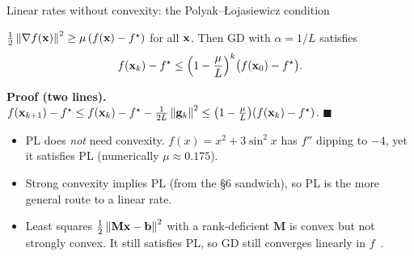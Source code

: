 \begin{frame}{Linear rates without convexity: the Polyak--{\L}ojasiewicz condition}
  \begin{thmbox}
    $\tfrac12\left\lVert \nabla f(\mathbf{x}) \right\rVert^2\ge\mu\,(f(\mathbf{x})-f^\star)$ for all $\mathbf{x}$. Then GD with $\alpha = 1/L$ satisfies
    \[ f(\mathbf{x}_k)-f^\star\le\Bigl(1-\frac\mu L\Bigr)^k\bigl(f(\mathbf{x}_0)-f^\star\bigr). \]
  \end{thmbox}
  \small\textbf{Proof (two lines).}
  $f(\mathbf{x}_{k+1})-f^\star\le f(\mathbf{x}_k)-f^\star-\tfrac1{2L}\left\lVert \mathbf{g}_k \right\rVert^2\le\bigl(1-\tfrac\mu L\bigr)(f(\mathbf{x}_k)-f^\star)$. $\blacksquare$
  \begin{itemize}\small
    \item PL does \emph{not} need convexity. $f(x) = x^2+3\sin^2x$ has $f''$ dipping to $-4$,
          yet it satisfies PL (numerically $\mu\approx0.175$).
    \item Strong convexity implies PL (from the \S6 sandwich), so PL is the more general route to a linear rate.
    \item Least squares $\tfrac12\left\lVert \mathbf M\mathbf{x}-\mathbf{b} \right\rVert^2$ with a rank-deficient $\mathbf M$ is convex but not strongly convex.
          It still satisfies PL, so GD still converges linearly in $f$~\cite{karimi2016}.
  \end{itemize}
\end{frame}

